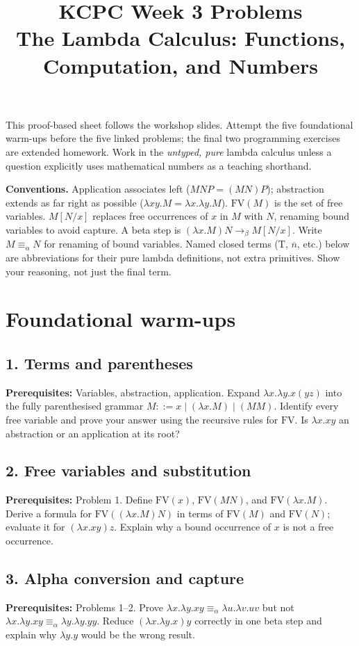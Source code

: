 \documentclass[12pt]{article}
\title{KCPC Week 3 Problems\\The Lambda Calculus: Functions, Computation, and Numbers}
\author{}\date{}
\begin{document}
\maketitle\thispagestyle{fancy}

This proof-based sheet follows the workshop slides. Attempt the five foundational warm-ups before the five linked problems; the final two programming exercises are extended homework. Work in the \emph{untyped, pure} lambda calculus unless a question explicitly uses mathematical numbers as a teaching shorthand.

\textbf{Conventions.} Application associates left ($MNP=(MN)P$); abstraction extends as far right as possible ($\lambda xy.M=\lambda x.\lambda y.M$). $\mathrm{FV}(M)$ is the set of free variables. $M[N/x]$ replaces free occurrences of $x$ in $M$ with $N$, renaming bound variables to avoid capture. A beta step is $(\lambda x.M)N\to_\beta M[N/x]$. Write $M\equiv_\alpha N$ for renaming of bound variables. Named closed terms ($\mathrm{T}$, $\overline n$, etc.) below are abbreviations for their pure lambda definitions, not extra primitives. Show your reasoning, not just the final term.

\section{Foundational warm-ups}

\subsection*{1. Terms and parentheses}
\textbf{Prerequisites:} Variables, abstraction, application.
Expand $\lambda x.\lambda y.x(yz)$ into the fully parenthesised grammar $M::=x\mid(\lambda x.M)\mid(MM)$. Identify every free variable and prove your answer using the recursive rules for $\mathrm{FV}$. Is $\lambda x.xy$ an abstraction or an application at its root?

\subsection*{2. Free variables and substitution}
\textbf{Prerequisites:} Problem 1.
Define $\mathrm{FV}(x)$, $\mathrm{FV}(MN)$, and $\mathrm{FV}(\lambda x.M)$. Derive a formula for $\mathrm{FV}((\lambda x.M)N)$ in terms of $\mathrm{FV}(M)$ and $\mathrm{FV}(N)$; evaluate it for $(\lambda x.xy)z$. Explain why a bound occurrence of $x$ is not a free occurrence.

\subsection*{3. Alpha conversion and capture}
\textbf{Prerequisites:} Problems 1--2.
Prove $\lambda x.\lambda y.xy\equiv_\alpha\lambda u.\lambda v.uv$ but not $\lambda x.\lambda y.xy\equiv_\alpha\lambda y.\lambda y.yy$. Reduce $(\lambda x.\lambda y.x)y$ correctly in one beta step and explain why $\lambda y.y$ would be the wrong result.
\end{document}
